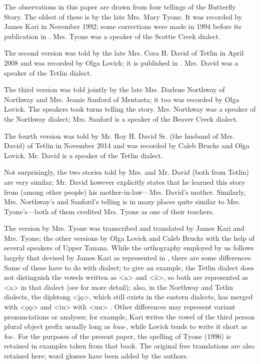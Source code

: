 The observations in this paper are drawn from four tellings of the Butterfly Story. The oldest of these is by the late Mrs. Mary Tyone. It was recorded by James Kari in November 1992; some corrections were made in 1994 before its publication in \citet[23–33]{TyoneM1996}. Mrs. Tyone was a speaker of the Scottie Creek dialect.

The second version was told by the late Mrs. Cora H. David of Tetlin in April 2008 and was recorded by Olga Lovick; it is published in \citet[118–133]{DavidC2011}. Mrs. David was a speaker of the Tetlin dialect.

The third version was told jointly by the late Mrs. Darlene Northway of Northway and Mrs. Jeanie Sanford of Mentasta; it too was recorded by Olga Lovick. The speakers took turns telling the story. Mrs. Northway was a speaker of the Northway dialect; Mrs. Sanford is a speaker of the Beaver Creek dialect.

The fourth version was told by Mr. Roy H. David Sr. (the husband of Mrs. David) of Tetlin in November 2014 and was recorded by Caleb Brucks and Olga Lovick. Mr. David is a speaker of the Tetlin dialect.

Not surprisingly, the two stories told by Mrs. and Mr. David (both from Tetlin) are very similar; Mr. David however explicitly states that he learned this story from (among other people) his mother-in-law—Mrs. David's mother. Similarly, Mrs. Northway's and Sanford's telling is in many places quite similar to Mrs. Tyone's—both of them credited Mrs. Tyone as one of their teachers.

The version by Mrs. Tyone was transcribed and translated by James Kari and Mrs. Tyone; the other versions by Olga Lovick and Caleb Brucks with the help of several speakers of Upper Tanana. While the orthography employed by us follows largely that devised by James Kari as represented in \citet[xi-xvi]{TyoneM1996}, there are some differences. Some of these have to do with dialect; to give an example, the Tetlin dialect does not distinguish the vowels written as <a> and <ä>, so both are represented as <a> in that dialect (see \citealp{TuttleSLovickONunez-OrtizI2011} for more detail); also, in the Northway and Tetlin dialects, the diphtong <įǫ>, which still exists in the eastern dialects, has merged with <ǫǫ> and <iu> with <uu> \citep{LovickO2011}. Other differences may represent variant pronunciations or analyses; for example, Kari writes the vowel of the third person plural object prefix usually long as {\em huu}-, while Lovick tends to write it short as {\em hu}-. For the purposes of the present paper, the spelling of Tyone (1996) is retained in examples taken from that book. The original free translations are also retained here; word glosses have been added by the authors.

